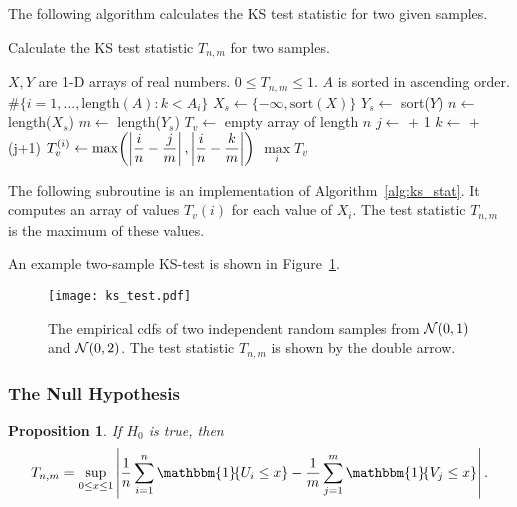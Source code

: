 \documentclass[letterpaper, oneside, reqno]{amsart}
\newtheorem{prop}{Proposition}[section]
\numberwithin{equation}{section}
\newcommand{\N}[2]{\mathcal{N}\mleft( #1, #2 \mright)}
\newcommand{\indic}[1]{\mathbbm{1}\!\mleft\{#1\mright\}} %
\newcommand{\sumi}[2]{\sum_{#1=1}^{#2}}
\newcommand{\avg}[2]{\frac{1}{#2}\sumi{#1}{#2}}
\begin{document}
\clearpage
The following algorithm calculates the KS test statistic for two given samples.
\begin{algorithm}[!h]
  \caption{Calculate the KS test statistic $T_{n,m}$ for two samples.}
  \label{alg:ks_stat}
  \begin{algorithmic}[1]
    \Require $X, Y$ are 1-D arrays of real numbers.
    \Ensure $0 \le T_{n,m} \le 1$.
       $A$ is sorted in ascending order.
      \State\Return $\#\{i=1,\dots,\text{length}(A) \colon k < A_i\}$
    \EndFunction
    \State $X_s \gets \{-\infty, \text{sort}(X)\}$
    \State $Y_s \gets$ sort($Y$)
    \State $n \gets$ length($X_s$)
    \State $m \gets$ length($Y_s$)
    \State $T_v \gets$ empty array of length $n$
      \State $j \gets$  + 1
      \State $k \gets$ 
      + (j+1)
      \State $\displaystyle{T_v^{(i)} \gets 
        \max\mleft(\left|\frac{i}{n} - \frac{j}{m}\right|,
              \left|\frac{i}{n} - \frac{k}{m}\right|\mright)}$
    \EndFor
    \State\Return $\max\limits_i T_v$
    \EndProcedure
  \end{algorithmic}
\end{algorithm}

\clearpage
The following subroutine is an implementation of Algorithm~\ref{alg:ks_stat}. It computes an array of values $T_v(i)$ for each value of $X_i$. The test statistic $T_{n,m}$ is the maximum of these values.


\clearpage
An example two-sample KS-test is shown in Figure~\ref{fig:ks_test}.
\begin{figure}[!h]
  \centering
  \texttt{[image: ks\_test.pdf]}
  \caption{The empirical cdfs of two independent random samples from $\N{0}{1}$ and $\N{0}{2}$. The test statistic $T_{n,m}$ is shown by the double arrow.}
  \label{fig:ks_test}
\end{figure}

\subsubsection{The Null Hypothesis}
\begin{prop}
  If $H_0$ is true, then
  \[ T_{n,m} = \sup_{0 \le x \le 1} \left| \avg{i}{n} \indic{U_i \le x}
- \avg{j}{m} \indic{V_j \le x} \right|. \]
\end{prop}
\end{document}

